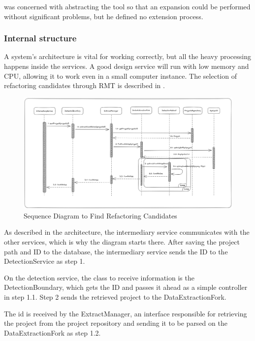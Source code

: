 \textcite{beluzzo2018abordagem} was concerned with abstracting the tool so that an expansion could be performed without significant problems, but he defined no extension process.

\subsubsection{Internal structure}
\label{subsub-internal}

A system's architecture is vital for working correctly, but all the heavy processing happens inside the services. A good design service will run with low memory and CPU, allowing it to work even in a small computer instance. The selection of refactoring candidates through RMT is described in .

\begin{figure}[ht!]
\SetCaptionWidth{\textwidth}
\caption{Sequence Diagram to Find Refactoring Candidates}
\label{fig-candidates}
\includegraphics[width=160mm]{Chapter-2/Figures/candidates.png}
\end{figure}

As described in the architecture, the intermediary service communicates with the other services, which is why the diagram starts there. After saving the project path and ID to the database, the intermediary service sends the ID to the DetectionService as step 1.

On the detection service, the class to receive information is the DetectionBoundary, which gets the ID and passes it ahead as a simple controller in step 1.1. Step 2 sends the retrieved project to the DataExtractionFork.

The id is received by the ExtractManager, an interface responsible for retrieving the project from the project repository and sending it to be parsed on the DataExtractionFork as step 1.2.

